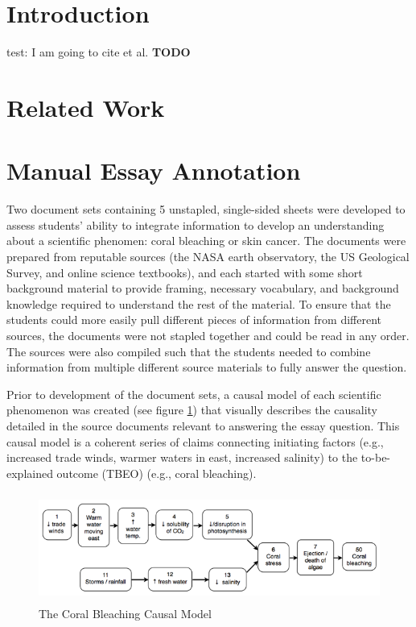 \documentclass[runningheads,a4paper]{llncs}
\begin{document}
\section{Introduction}
test: I am going to cite \cite{Vapnik:95}  et al.
\textbf{TODO}

\section{Related Work}
\section{Manual Essay Annotation}
Two document sets containing 5 unstapled, single-sided sheets were developed to
assess students’ ability to integrate information to develop an understanding
about a scientific phenomen: coral bleaching or skin cancer. The documents were
prepared from reputable sources (the NASA earth observatory, the US Geological
Survey, and online science textbooks), and each started with some short
background material to provide framing, necessary vocabulary, and background
knowledge required to understand the rest of the material. To ensure that the
students could more easily pull different pieces of information from different
sources, the documents were not stapled together and could be read in any order.
The sources were also compiled such that the students needed to combine
information from multiple different source materials to fully answer the
question.

Prior to development of the document sets, a causal model of each scientific
phenomenon was created (see figure \ref{fig:cb_causalmodel}) that visually
describes the causality detailed in the source documents relevant to answering
the essay question. This causal model is a coherent series of claims connecting
initiating factors (e.g., increased trade winds, warmer waters in east,
increased salinity) to the to-be-explained outcome (TBEO) (e.g., coral
bleaching).


\begin{figure}
\centering
\includegraphics[height=3.6cm]{CoralBeachSemanticModel.png}
\caption{The Coral Bleaching Causal Model}
\label{fig:cb_causalmodel}
\end{figure}
\end{document}
